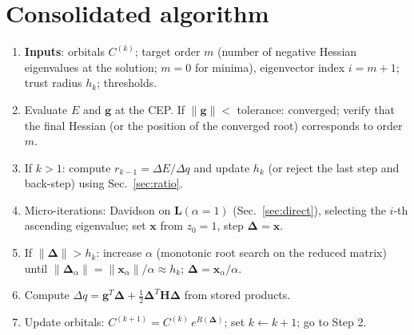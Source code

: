 \documentclass[11pt,a4paper]{article}
\newcommand{\bH}{\mathbf{H}}
\newcommand{\bL}{\mathbf{L}}
\newcommand{\bg}{\mathbf{g}}
\newcommand{\bx}{\mathbf{x}}
\newcommand{\bd}{\boldsymbol{\Delta}}
\begin{document}
\section{Consolidated algorithm}
\begin{enumerate}[label=\textbf{Step \arabic*.},leftmargin=*,nosep]
 \item \textbf{Inputs}: orbitals $C^{(k)}$; target order $m$ (number of negative Hessian eigenvalues at the solution; $m=0$ for minima), eigenvector index $i=m+1$; trust radius $h_k$; thresholds.
 \item Evaluate $E$ and $\bg$ at the CEP. If $\|\bg\|<$ tolerance: converged; verify that the final Hessian (or the position of the converged root) corresponds to order $m$.
 \item If $k>1$: compute $r_{k-1}=\Delta E/\Delta q$ and update $h_k$ (or reject the last step and back-step) using Sec.~\ref{sec:ratio}.
 \item Micro-iterations: Davidson on $\bL(\alpha=1)$ (Sec.~\ref{sec:direct}), selecting the $i$-th ascending eigenvalue; set $\bx$ from $z_0=1$, step $\bd=\bx$.
 \item If $\|\bd\|>h_k$: increase $\alpha$ (monotonic root search on the reduced matrix) until $\|\bd_\alpha\|=\|\bx_\alpha\|/\alpha\approx h_k$; $\bd=\bx_\alpha/\alpha$.
 \item Compute $\Delta q=\bg^T\bd+\tfrac12\bd^T\bH\bd$ from stored products.
 \item Update orbitals: $C^{(k+1)}=C^{(k)}\,e^{R(\bd)}$; set $k\leftarrow k+1$; go to Step 2.
\end{enumerate}

\end{document}
